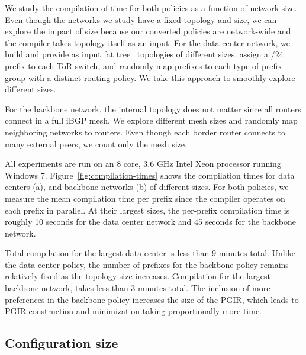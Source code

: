 \documentclass{sig-alternate-10pt}
\begin{document}
We study the compilation of time for both policies as a function of network size. Even though the networks we study have a fixed topology and size, we can explore the impact of size because our converted policies are network-wide and the compiler takes topology itself as an input. For the data center network, we build and provide as input fat tree~\cite{fattree} topologies of different sizes, assign a /24 prefix to each ToR switch, and randomly map prefixes to each type of prefix group with a distinct routing policy. We take this approach to smoothly explore different sizes. 

For the backbone network, the internal topology does not matter since all routers connect in a full iBGP mesh. We explore different mesh sizes and randomly map neighboring networks to routers. Even though each border router connects to many external peers, we count only the mesh size.

All experiments are run on an 8 core, 3.6 GHz Intel Xeon processor running Windows 7.
%
Figure~\ref{fig:compilation-times} shows the compilation times for data centers (a), and backbone networks (b) of different sizes. For both policies, we measure the mean compilation time per prefix since the compiler operates on each prefix in parallel. At their largest sizes, the per-prefix compilation time is roughly 10 seconds for the data center network and 45 seconds for the backbone network.


Total compilation for the largest data center is less than 9 minutes total. Unlike the data center policy, the number of prefixes for the backbone policy remains relatively fixed as the topology size increases. Compilation for the largest backbone network, takes less than 3 minutes total. The inclusion of more preferences in the backbone policy increases the size of the PGIR, which leads to PGIR construction and minimization taking proportionally more time.

%


\subsection{Configuration size}
\end{document}
